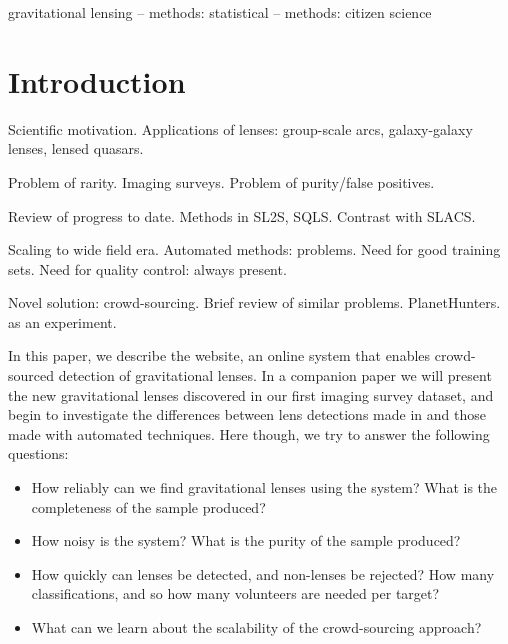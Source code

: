 \documentclass[useAMS,usenatbib,a4paper]{mn2e}
\begin{document}

\begin{keywords}
  gravitational lensing   --
  methods: statistical    --
  methods: citizen science
\end{keywords}

\setcounter{footnote}{1}


\section{Introduction}
\label{sec:intro}

Scientific motivation. Applications of lenses: group-scale arcs,
galaxy-galaxy lenses, lensed quasars. 

Problem of rarity. Imaging surveys. Problem of purity/false positives.

Review of progress to date. Methods in SL2S, SQLS. Contrast with SLACS. 

Scaling to wide field era. Automated methods: problems. Need for good
training sets. Need for quality control: always present.

Novel solution: crowd-sourcing. Brief review of similar problems.
PlanetHunters. \sw as an experiment.

In this paper, we describe the \sw website, an online system that enables
crowd-sourced detection of gravitational lenses.  In a companion paper we will
present the new gravitational lenses discovered in our first imaging survey
dataset, and begin to investigate the differences between lens detections made
in \sw and those made with automated techniques. Here though, we try to answer
the following questions:

\begin{itemize}

\item How reliably can we find gravitational lenses using the \sw
system? What is the completeness of the sample produced?

\item How noisy is the system? What is the purity of the sample
produced?

\item How quickly can lenses be detected, and non-lenses be rejected?
How many classifications, and so how many volunteers are needed per target?

\item What can we learn about the scalability of the crowd-sourcing approach?

\end{itemize}
\end{document}
